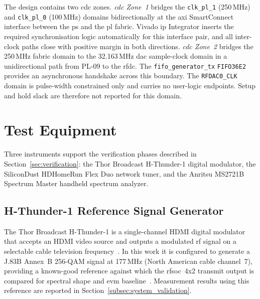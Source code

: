 The design contains two \ac{cdc} zones.
\emph{\Ac{cdc} Zone~1} bridges the \texttt{clk\_pl\_1} (250\,MHz)
and \texttt{clk\_pl\_0} (100\,MHz) domains bidirectionally at the
\ac{axi} SmartConnect interface between the \ac{ps} and the \ac{pl}
fabric.
Vivado \ac{ip} Integrator inserts the required synchronisation logic
automatically for this interface pair, and all inter-clock paths close
with positive margin in both directions.
\emph{\Ac{cdc} Zone~2} bridges the 250\,MHz fabric domain to the
32.163\,MHz \ac{dac} sample-clock domain in a unidirectional path
from PL-09 to the \ac{rfdc}.
The \texttt{fifo\_generator\_tx} \texttt{FIFO36E2} provides an
asynchronous handshake across this boundary.
The \texttt{RFDAC0\_CLK} domain is pulse-width constrained only and
carries no user-logic endpoints.
Setup and hold slack are therefore not reported for this domain.

\clearpage

\section{Test Equipment}
\label{sec:test_equipment}

Three instruments support the verification phases described in
Section~\ref{sec:verification}: the Thor Broadcast H-Thunder-1 digital
modulator, the SiliconDust HDHomeRun Flex Duo network tuner, and the
Anritsu MS2721B Spectrum Master handheld spectrum analyzer.

\subsection{H-Thunder-1 Reference Signal Generator}
\label{subsec:hthunder}

The Thor Broadcast H-Thunder-1 is a single-channel HDMI digital
modulator that accepts an HDMI video source and outputs a modulated
\ac{rf} signal on a selectable cable television
frequency~\cite{ThorH1}.
In this work it is configured to generate a J.83B Annex~B 256-QAM
signal at 177\,MHz (North American cable channel~7), providing a
known-good reference against which the \ac{rfsoc}~4x2 transmit
output is compared for spectral shape and \ac{evm}
baseline~\cite{ThorH1,ITU_J83}.
Measurement results using this reference are reported in
Section~\ref{subsec:system_validation}.

